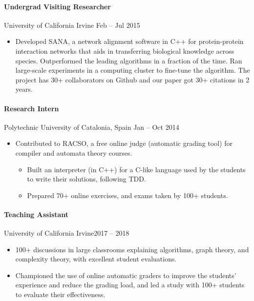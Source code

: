 \documentclass[letterpaper,10pt,oneside]{article}
\begin{document}
\paragraph*{Undergrad Visiting Researcher} University of California Irvine \hfill Feb -- Jul 2015
\begin{itemize}[leftmargin=15px]
	\item Developed SANA, a network alignment software in C++ for protein-protein interaction networks that aids in transferring biological knowledge across species. Outperformed the leading algorithms in a fraction of the time. Ran
	large-scale experiments in a computing cluster to fine-tune the algorithm.
	The project has 30+ collaborators on Github and our paper got 30+ citations in 2 years.	 
\end{itemize}
\paragraph*{Research Intern} Polytechnic University of Catalonia, Spain \hfill Jan -- Oct 2014
\begin{itemize}[leftmargin=15px]
\item Contributed to RACSO, a free online judge (automatic grading tool) for compiler and automata theory courses.
	\begin{itemize}[leftmargin=15px,topsep=0px]
		\item Built an interpreter (in C++) for a C-like language used by the students to write their solutions, following TDD.
		\item Prepared 70+ online exercises, and exams taken by 100+ students.
	\end{itemize}
\end{itemize}
\paragraph*{Teaching Assistant} University of California Irvine\hfill 2017 -- 2018
\begin{itemize}[leftmargin=15px]
	\item 100+ discussions in large classrooms explaining algorithms, graph theory, and complexity theory, with excellent student evaluations.
	\item Championed the use of online automatic graders to improve the students' experience and reduce the grading load, and led a study with 100+ students to evaluate their effectiveness.
\end{itemize}
\end{document}
